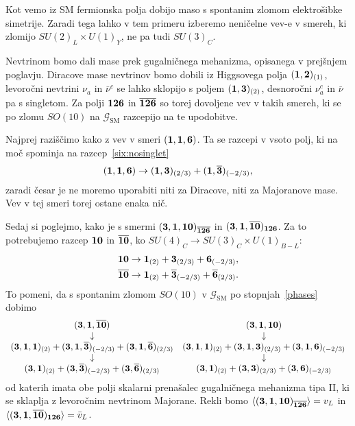 Kot vemo iz SM fermionska polja dobijo maso s spontanim zlomom elektrošibke simetrije. Zaradi tega
lahko v tem primeru izberemo neničelne vev-e v smereh, ki zlomijo $SU(2)_L\times U(1)_Y$, ne pa
tudi $SU(3)_C$.

Nevtrinom bomo dali mase prek gugalničnega mehanizma, opisanega v prejšnjem poglavju. Diracove mase
nevtrinov bomo dobili iz Higgsovega polja $(\mathbf{1}, \mathbf{2})_{(1)}$, levoročni nevtrini $\nu_a$ in $\bar{\nu}^c$
se lahko sklopijo s poljem $(\mathbf{1}, \mathbf{3})_{(2)}$, desnoročni $\nu^c_a$ in $\bar{\nu}$ pa s singletom. Za
polji $\mathbf{126}$ in $\overline{\mathbf{126}}$ so torej dovoljene vev v takih smereh, ki se po zlomu $SO(10)$ na
$\mathcal{G}_\text{SM}$ razcepijo na te upodobitve.

Najprej raziščimo kako z vev v smeri $(\mathbf{1}, \mathbf{1}, \mathbf{6})$. Ta se razcepi v vsoto polj, ki na moč spominja
na razcep~\eqref{six:nosinglet}
\begin{equation}
	(\mathbf{1}, \mathbf{1}, \mathbf{6}) \to (\mathbf{1}, \mathbf{3})_{(2/3)} + (\mathbf{1}, \overline{\mathbf{3}})_{(-2/3)},
\end{equation}
zaradi česar je ne moremo uporabiti niti za Diracove, niti za Majoranove mase. Vev v tej smeri torej
ostane enaka nič.

Sedaj si poglejmo, kako je s smermi $(\mathbf{3}, \mathbf{1}, \mathbf{10})_{\overline{\mathbf{126}}}$ in $(\mathbf{3}, \mathbf{1}, \overline{\mathbf{10}})_{\mathbf{126}}$.
Za to potrebujemo razcep $\mathbf{10}$ in $\overline{\mathbf{10}}$, ko $SU(4)_C \to SU(3)_C \times U(1)_{B-L}$:
\begin{align}
	\mathbf{10} &\to \mathbf{1}_{(2)} + \mathbf{3}_{(2/3)} + \mathbf{6}_{(-2/3)}, \notag \\
	\overline{\mathbf{10}} &\to \mathbf{1}_{(2)} + \overline{\mathbf{3}}_{(-2/3)} + \overline{\mathbf{6}}_{(2/3)}.
\end{align}
To pomeni, da s spontanim zlomom $SO(10)$ v $\mathcal{G}_\text{SM}$ po stopnjah~\eqref{phases} dobimo
\begin{align}
	\begin{array}{c}
		(\mathbf{3}, \mathbf{1}, \overline{\mathbf{10}}) \\
		\downarrow \\
		(\mathbf{3}, \mathbf{1}, \mathbf{1})_{(2)} + (\mathbf{3}, \mathbf{1}, \overline{\mathbf{3}})_{(-2/3)} + (\mathbf{3}, \mathbf{1}, \overline{\mathbf{6}})_{(2/3)} \\
		\downarrow \\
		(\mathbf{3}, \mathbf{1})_{(2)} + (\mathbf{3}, \overline{\mathbf{3}})_{(-2/3)} + (\mathbf{3}, \overline{\mathbf{6}})_{(2/3)}
	\end{array}
	\begin{array}{c}
		(\mathbf{3}, \mathbf{1}, \mathbf{10}) \\
		\downarrow \\
		(\mathbf{3}, \mathbf{1}, \mathbf{1})_{(2)} + (\mathbf{3}, \mathbf{1}, \mathbf{3})_{(2/3)} + (\mathbf{3}, \mathbf{1}, \mathbf{6})_{(-2/3)} \\
		\downarrow \\
		(\mathbf{3}, \mathbf{1})_{(2)} + (\mathbf{3}, \mathbf{3})_{(2/3)} + (\mathbf{3}, \mathbf{6})_{(-2/3)}
	\end{array}
	\label{1310bar}
\end{align}
od katerih imata obe polji skalarni prenašalec gugalničnega mehanizma tipa II, ki se sklaplja z
levoročnim nevtrinom Majorane. Rekli bomo $\langle (\mathbf{3}, \mathbf{1}, \mathbf{10})_{\overline{\mathbf{126}}} \rangle = v_L$ in
$\langle (\mathbf{3}, \mathbf{1}, \overline{\mathbf{10}})_{\mathbf{126}} \rangle = \bar{v}_L$.

